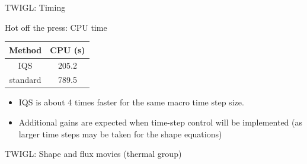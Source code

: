 \documentclass[8pt]{beamer}
\begin{document}
\begin{frame}{TWIGL:  Timing}


\begin{block}{Hot off the press: CPU time}

\begin{table}[h]
\begin{center}
\begin{tabular}{|c|c|}
\hline 
Method   &  CPU (s)  \\ \hline 
IQS      &  205.2    \\ \hline 
standard &  789.5    \\ \hline 
\end{tabular}
\end{center}
\end{table}

\begin{itemize}
\item
IQS is about 4 times faster for the same macro time step size.
\item
Additional gains are expected when time-step control will be implemented (as larger time steps may be taken for the shape equations)
\end{itemize}

\end{block}

\end{frame}

\begin{frame}{TWIGL:  Shape and flux movies (thermal group)}
\begin{center}
\end{center}
\end{frame}
\end{document}
